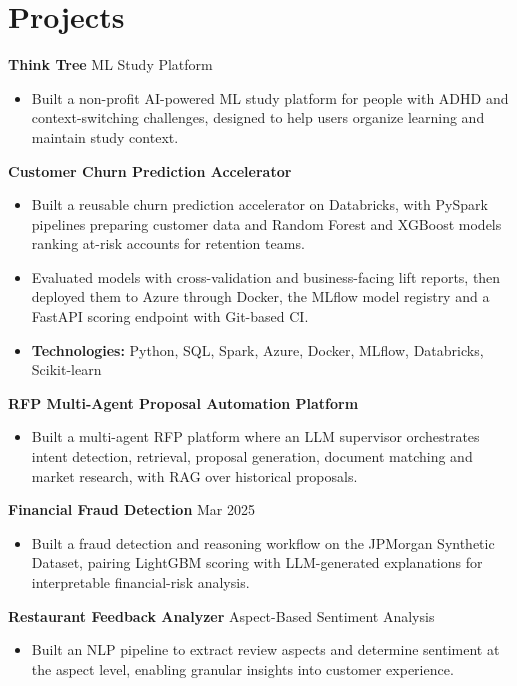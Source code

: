 \documentclass[10pt,a4paper]{article}
\begin{document}
\section{Projects}
\textbf{Think Tree} \textbar{} ML Study Platform\par
\begin{itemize}
  \item Built a non-profit AI-powered ML study platform for people with ADHD and context-switching challenges, designed to help users organize learning and maintain study context.
\end{itemize}
\textbf{Customer Churn Prediction Accelerator}\par
\begin{itemize}
  \item Built a reusable churn prediction accelerator on Databricks, with PySpark pipelines preparing customer data and Random Forest and XGBoost models ranking at-risk accounts for retention teams.
  \item Evaluated models with cross-validation and business-facing lift reports, then deployed them to Azure through Docker, the MLflow model registry and a FastAPI scoring endpoint with Git-based CI.
  \item \textbf{Technologies:} Python, SQL, Spark, Azure, Docker, MLflow, Databricks, Scikit-learn
\end{itemize}
\textbf{RFP Multi-Agent Proposal Automation Platform}\par
\begin{itemize}
  \item Built a multi-agent RFP platform where an LLM supervisor orchestrates intent detection, retrieval, proposal generation, document matching and market research, with RAG over historical proposals.
\end{itemize}
\textbf{Financial Fraud Detection} \textbar{} Mar 2025\par
\begin{itemize}
  \item Built a fraud detection and reasoning workflow on the JPMorgan Synthetic Dataset, pairing LightGBM scoring with LLM-generated explanations for interpretable financial-risk analysis.
\end{itemize}
\textbf{Restaurant Feedback Analyzer} \textbar{} Aspect-Based Sentiment Analysis\par
\begin{itemize}
  \item Built an NLP pipeline to extract review aspects and determine sentiment at the aspect level, enabling granular insights into customer experience.
\end{itemize}
\end{document}
